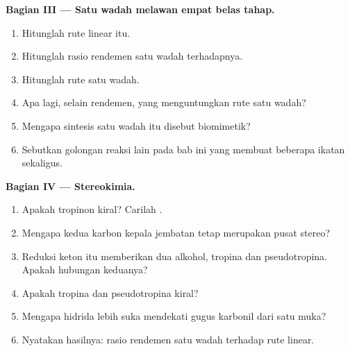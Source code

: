 \begin{problem}
\medskip\noindent\textbf{Bagian III --- Satu wadah melawan empat belas tahap.}
\begin{enumerate}[resume, beginpenalty=10000]
  \item Hitunglah  rute linear itu.
  \item Hitunglah rasio rendemen satu wadah terhadapnya.
  \item Hitunglah  rute satu wadah.
  \item Apa lagi, selain rendemen, yang menguntungkan rute satu wadah?
  \item Mengapa sintesis satu wadah itu disebut biomimetik?
  \item Sebutkan golongan reaksi lain pada bab ini yang membuat beberapa ikatan sekaligus.
\end{enumerate}

\medskip\noindent\textbf{Bagian IV --- Stereokimia.}
\begin{enumerate}[resume, beginpenalty=10000]
  \item Apakah tropinon kiral? Carilah .
  \item Mengapa kedua karbon kepala jembatan tetap merupakan pusat stereo?
  \item Reduksi keton itu memberikan dua alkohol, tropina dan pseudotropina. Apakah
        hubungan keduanya?
  \item Apakah tropina dan pseudotropina kiral?
  \item Mengapa hidrida lebih suka mendekati gugus karbonil dari satu muka?
  \item Nyatakan hasilnya: rasio rendemen satu wadah terhadap 
        rute linear.
\end{enumerate}
\end{problem}
